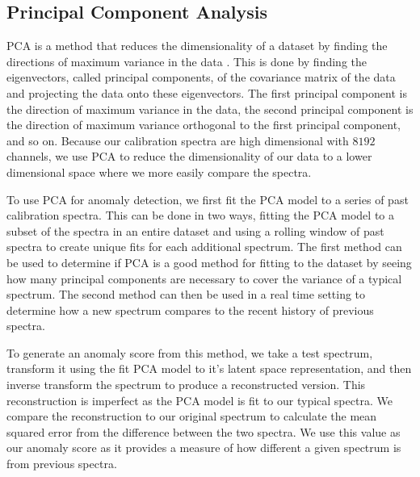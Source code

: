\subsection{Principal Component Analysis}
PCA is a method that reduces the dimensionality of a dataset by finding the directions of maximum variance in the data \cite{wold1987principal}.
This is done by finding the eigenvectors, called principal components, of the covariance matrix of the data and projecting the data onto these eigenvectors.
The first principal component is the direction of maximum variance in the data, the second principal component is the direction of maximum variance orthogonal to the first principal component, and so on.
Because our calibration spectra are high dimensional with $8192$ channels, we use PCA to reduce the dimensionality of our data to a lower dimensional space where we more easily compare the spectra.

To use PCA for anomaly detection, we first fit the PCA model to a series of past calibration spectra.
This can be done in two ways, fitting the PCA model to a subset of the spectra in an entire dataset and using a rolling window of past spectra to create unique fits for each additional spectrum. 
The first method can be used to determine if PCA is a good method for fitting to the dataset by seeing how many principal components are necessary to cover the variance of a typical spectrum. 
The second method can then be used in a real time setting to determine how a new spectrum compares to the recent history of previous spectra. 

To generate an anomaly score from this method, we take a test spectrum, transform it using the fit PCA model to it's latent space representation, and then inverse transform the spectrum to produce a reconstructed version. 
This reconstruction is imperfect as the PCA model is fit to our typical spectra.
We compare the reconstruction to our original spectrum to calculate the mean squared error from the difference between the two spectra. 
We use this value as our anomaly score as it provides a measure of how different a given spectrum is from previous spectra. 

